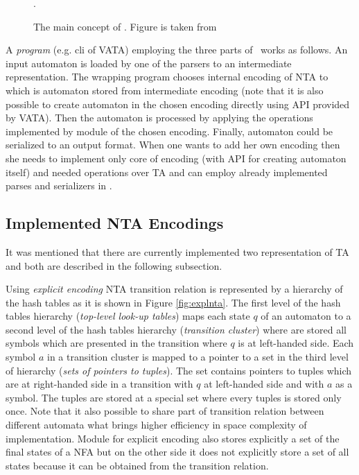 \begin{figure}[bt]
\begin{center}

		\caption{The main concept of \vata. Figure is taken from \cite{libvata}}.
		\label{fig:vata}
\end{center}
\end{figure}

A \emph{program} (e.g. cli of VATA) employing the three parts of \vata\ works as follows.
An input automaton is loaded by one of the parsers to an intermediate representation.
The wrapping program chooses internal encoding of NTA to which is automaton stored from intermediate encoding (note that it is also
possible to create automaton in the chosen encoding directly using API provided by VATA).
Then the automaton is processed by applying the operations implemented by module of the chosen encoding.
Finally, automaton could be serialized to an output format.
When one wants to add her own encoding then she needs to implement only core of encoding (with API for creating automaton itself)
and needed operations over TA and can employ already implemented parses and serializers in \vata.

\subsection{Implemented NTA Encodings}

It was mentioned that there are currently implemented two representation of TA and both are described in the following subsection.

Using \emph{explicit encoding} NTA transition relation is represented by a hierarchy of the hash tables as it is shown in Figure \ref{fig:explnta}.
The first level of the hash tables hierarchy (\emph{top-level look-up tables}) maps each state $q$ of an automaton to 
a second level of the hash tables hierarchy (\emph{transition cluster}) where are stored all symbols which
are presented in the transition where $q$ is at left-handed side.
Each symbol $a$ in a transition cluster is mapped to a pointer to a set in the third level of hierarchy (\emph{sets of pointers to tuples}).
The set contains pointers to tuples which are at right-handed side in a transition with $q$ at left-handed side and with $a$ as a symbol.
The tuples are stored at a special set where every tuples is stored only once.
Note that it also possible to share part of transition relation between different automata what
brings higher efficiency in space complexity of implementation.
Module for explicit encoding also stores explicitly a set of the final states of a NFA but on
the other side it does not explicitly store a set of all states because it can be obtained from the transition relation.

